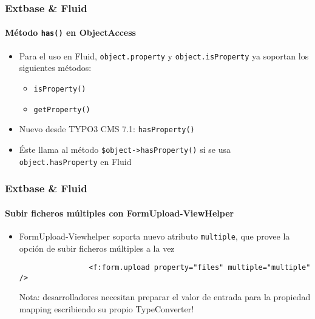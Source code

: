 \begin{frame}[fragile]
	\frametitle{Extbase \& Fluid}
	\framesubtitle{Método \texttt{has()} en ObjectAccess}

	\begin{itemize}

		\item Para el uso en Fluid, \texttt{object.property} y \texttt{object.isProperty} ya
			soportan los siguientes métodos:

			\begin{itemize}
				\item \texttt{isProperty()}
				\item \texttt{getProperty()}
			\end{itemize}

		\item Nuevo desde TYPO3 CMS 7.1: \texttt{hasProperty()}
		\item Éste llama al método \texttt{\$object->hasProperty()}\newline
			si se usa \texttt{object.hasProperty} en Fluid

	\end{itemize}

\end{frame}


\begin{frame}[fragile]
	\frametitle{Extbase \& Fluid}
	\framesubtitle{Subir ficheros múltiples con FormUpload-ViewHelper}

	\begin{itemize}

		\item FormUpload-Viewhelper soporta nuevo atributo \texttt{multiple}, que provee la
			opción de subir ficheros múltiples a la vez

			\begin{lstlisting}
				<f:form.upload property="files" multiple="multiple" />
			\end{lstlisting}

			\vspace{0.2cm}

			\begingroup
				\color{red}
					Nota: desarrolladores necesitan preparar el valor de entrada para la propiedad mapping
					escribiendo su propio TypeConverter!
			\endgroup

	\end{itemize}

\end{frame}

